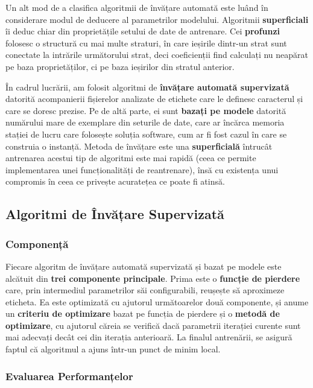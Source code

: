 \documentclass[../../main.tex]{subfiles}
\begin{document}
Un alt mod de a clasifica algoritmii de învățare automată este luând în considerare modul de deducere al parametrilor modelului. Algoritmii \textbf{superficiali} îi deduc chiar din proprietățile setului de date de antrenare. Cei \textbf{profunzi} folosesc o structură cu mai multe straturi, în care ieșirile dintr-un strat sunt conectate la intrările următorului strat, deci coeficienții find calculați nu neapărat pe baza proprietăților, ci pe baza ieșirilor din stratul anterior.

În cadrul lucrării, am folosit algoritmi de \textbf{învățare automată supervizată} datorită acompanierii fișierelor analizate de etichete care le definesc caracterul și care se doresc prezise. Pe de altă parte, ei sunt \textbf{bazați pe modele} datorită numărului mare de exemplare din seturile de date, care ar încărca memoria stației de lucru care folosește soluția software, cum ar fi fost cazul în care se construia o instanță. Metoda de învățare este una \textbf{superficială} întrucât antrenarea acestui tip de algoritmi este mai rapidă (ceea ce permite implementarea unei funcționalități de reantrenare), însă cu existența unui compromis în ceea ce privește acuratețea ce poate fi atinsă.

\subsection{Algoritmi de Învățare Supervizată}

\subsubsection{Componență}

Fiecare algoritm de învățare automată supervizată și bazat pe modele este alcătuit din \textbf{trei componente principale}. Prima este o \textbf{funcție de pierdere} care, prin intermediul parametrilor săi configurabili, reușește să aproximeze eticheta. Ea este optimizată cu ajutorul următoarelor două componente, și anume un \textbf{criteriu de optimizare} bazat pe funcția de pierdere și o \textbf{metodă de optimizare}, cu ajutorul căreia se verifică dacă parametrii iterației curente sunt mai adecvați decât cei din iterația anterioară. La finalul antrenării, se asigură faptul că algoritmul a ajuns într-un punct de minim local.

\subsubsection{Evaluarea Performanțelor}
\end{document}
